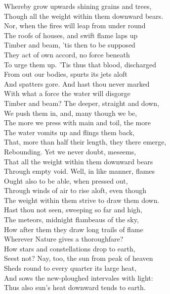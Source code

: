 Whereby grow upwards shining grains and trees,\\
Though all the weight within them downward bears.\\
Nor, when the fires will leap from under round\\
The roofs of houses, and swift flame laps up\\
Timber and beam, 'tis then to be supposed\\
They act of own accord, no force beneath\\
To urge them up. 'Tis thus that blood, discharged\\
From out our bodies, spurts its jets aloft\\
And spatters gore. And hast thou never marked\\
With what a force the water will disgorge\\
Timber and beam? The deeper, straight and down,\\
We push them in, and, many though we be,\\
The more we press with main and toil, the more\\
The water vomits up and flings them back,\\
That, more than half their length, they there emerge,\\
Rebounding. Yet we never doubt, meseems,\\
That all the weight within them downward bears\\
Through empty void. Well, in like manner, flames\\
Ought also to be able, when pressed out,\\
Through winds of air to rise aloft, even though\\
The weight within them strive to draw them down.\\
Hast thou not seen, sweeping so far and high,\\
The meteors, midnight flambeaus of the sky,\\
How after them they draw long trails of flame\\
Wherever Nature gives a thoroughfare?\\
How stars and constellations drop to earth,\\
Seest not? Nay, too, the sun from peak of heaven\\
Sheds round to every quarter its large heat,\\
And sows the new-ploughed intervales with light:\\
Thus also sun's heat downward tends to earth.\\

